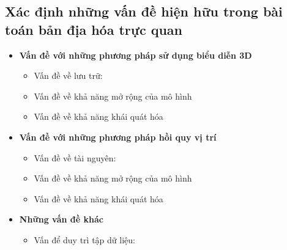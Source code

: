 \subsection*{Xác định những vấn đề hiện hữu trong bài toán bản địa hóa trực quan}

\begin{itemize}
    \item \textbf{Vấn đề với những phương pháp sử dụng biểu diễn 3D}
    \begin{itemize}
        \item Vấn đề về lưu trữ:
        \item Vấn đề về khả năng mở rộng của mô hình
        \item Vấn đề về khả năng khái quát hóa
    \end{itemize}
    \item \textbf{Vấn đề với những phương pháp hồi quy vị trí}
    \begin{itemize}
        \item Vấn đề về tài nguyên:
        \item Vấn đề về khả năng mở rộng của mô hình
        \item Vấn đề về khả năng khái quát hóa
    \end{itemize}
    \item \textbf{Những vấn đề khác}
    \begin{itemize}
        \item Vấn để duy trì tập dữ liệu:
    \end{itemize}
\end{itemize}

